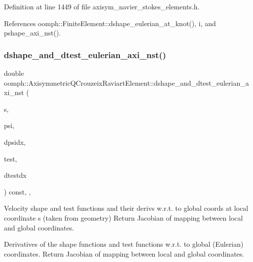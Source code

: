 Definition at line 1449 of file axisym\+\_\+navier\+\_\+stokes\+\_\+elements.\+h.



References oomph\+::\+Finite\+Element\+::dshape\+\_\+eulerian\+\_\+at\+\_\+knot(), i, and pshape\+\_\+axi\+\_\+nst().

\mbox{\label{classoomph_1_1AxisymmetricQCrouzeixRaviartElement_a48bd4be228495e97e5d8bf8a70162182}} 
\subsubsection{\texorpdfstring{dshape\+\_\+and\+\_\+dtest\+\_\+eulerian\+\_\+axi\+\_\+nst()}{dshape\_and\_dtest\_eulerian\_axi\_nst()}}
{\footnotesize\ttfamily double oomph\+::\+Axisymmetric\+Q\+Crouzeix\+Raviart\+Element\+::dshape\+\_\+and\+\_\+dtest\+\_\+eulerian\+\_\+axi\+\_\+nst (\begin{DoxyParamCaption}\item[{const \hyperlink{classoomph_1_1Vector}{Vector}$<$ double $>$ \&}]{s,  }\item[{\hyperlink{classoomph_1_1Shape}{Shape} \&}]{psi,  }\item[{\hyperlink{classoomph_1_1DShape}{D\+Shape} \&}]{dpsidx,  }\item[{\hyperlink{classoomph_1_1Shape}{Shape} \&}]{test,  }\item[{\hyperlink{classoomph_1_1DShape}{D\+Shape} \&}]{dtestdx }\end{DoxyParamCaption}) const\hspace{0.3cm}{\ttfamily [inline]}, {\ttfamily [protected]}, {\ttfamily [virtual]}}



Velocity shape and test functions and their derivs w.\+r.\+t. to global coords at local coordinate s (taken from geometry) Return Jacobian of mapping between local and global coordinates. 

Derivatives of the shape functions and test functions w.\+r.\+t. to global (Eulerian) coordinates. Return Jacobian of mapping between local and global coordinates. 

